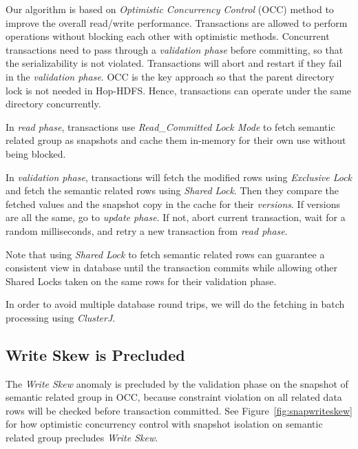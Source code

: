 Our algorithm is based on \textit{Optimistic Concurrency Control} (OCC) method to improve the overall read/write performance. Transactions are allowed to perform operations without blocking each other with optimistic methods. Concurrent transactions need to pass through a \textit{validation phase} before committing, so that the serializability is not violated. Transactions will abort and restart if they fail in the \textit{validation phase}. OCC is the key approach so that the parent directory lock is not needed in Hop-HDFS. Hence, transactions can operate under the same directory concurrently.

\noindent In \textit{read phase}, transactions use \textit{Read\_Committed Lock Mode} to fetch semantic related group as snapshots and cache them in-memory for their own use without being blocked.

\noindent In \textit{validation phase}, transactions will fetch the modified rows using \textit{Exclusive Lock} and fetch the semantic related rows using \textit{Shared Lock}. Then they compare the fetched values and the snapshot copy in the cache for their \textit{versions}. If versions are all the same, go to \textit{update phase}. If not, abort current transaction, wait for a random milliseconds, and retry a new transaction from \textit{read phase}.

\noindent Note that using \textit{Shared Lock} to fetch semantic related rows can guarantee a consistent view in database until the transaction commits while allowing other Shared Locks taken on the same rows for their validation phase.

\noindent In order to avoid multiple database round trips, we will do the fetching in batch processing using \textit{ClusterJ}.

\subsection{Write Skew is Precluded}

\noindent The \textit{Write Skew} anomaly is precluded by the validation phase on the snapshot of semantic related group in OCC, because constraint violation on all related data rows will be checked before transaction committed. See Figure~\ref{fig:snapwriteskew} for how optimistic concurrency control with snapshot isolation on semantic related group precludes \textit{Write Skew}.

